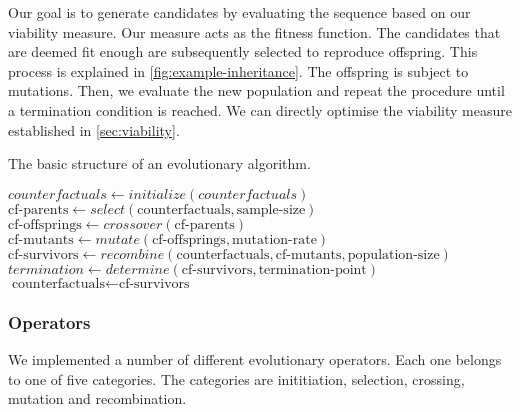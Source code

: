 \documentclass[./../../paper.tex]{subfiles}
\begin{document}
Our goal is to generate candidates by evaluating the sequence based on our viability measure. Our measure acts as the fitness function. The candidates that are deemed fit enough are subsequently selected to reproduce offspring. This process is explained in \autoref{fig:example-inheritance}. The offspring is subject to mutations. Then, we evaluate the new population and repeat the procedure until a termination condition is reached. We can directly optimise the viability measure established in \autoref{sec:viability}.

\newcommand{\cf}{\text{counterfactuals}}
\newcommand{\cfp}{\text{cf-parents}}
\newcommand{\cfo}{\text{cf-offsprings}}
\newcommand{\cfm}{\text{cf-mutants}}
\newcommand{\cfs}{\text{cf-survivors}}


\begin{algorithm}[htb!]
    \caption{The basic structure of an evolutionary algorithm.}
    \begin{algorithmic}

        \State $counterfactuals \gets initialize(counterfactuals)$
        \State $\cfp \gets select(\cf, \text{sample-size})$
        \State $\cfo \gets crossover(\cfp) $
        \State $\cfm \gets mutate(\cfo, \text{mutation-rate})$
        \State $\cfs \gets recombine(\cf, \cfm, \text{population-size})$
        \State $termination \gets determine(\cfs, \text{termination-point})$
        \State $\cf \gets \cfs$
        \EndWhile
    \end{algorithmic}
    \label{alg:my-evolutionary}
\end{algorithm}

\subsubsection{Operators}
We implemented a number of different evolutionary operators. Each one belongs to one of five categories. The categories are inititiation, selection, crossing, mutation and recombination.
\end{document}
